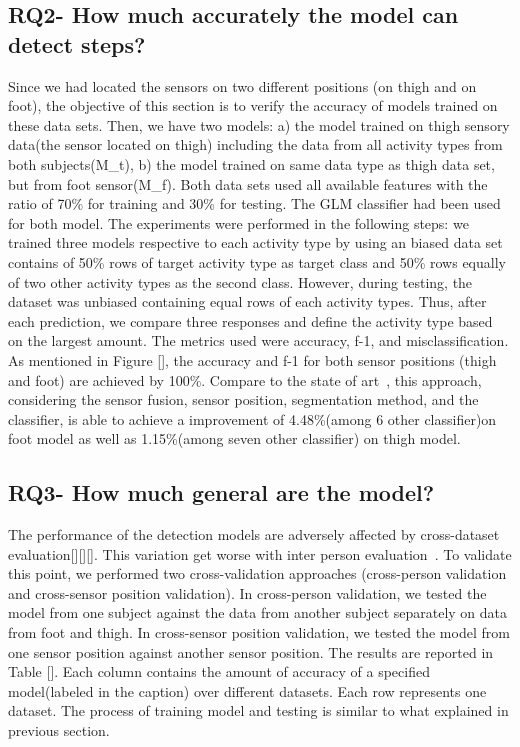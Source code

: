 \subsection{RQ2- How much accurately the model can detect steps?}
Since we had located the sensors on two different positions (on thigh and on foot), the objective of this section is to verify the accuracy of models trained on these data sets. Then, we have two models: a) the model trained on thigh sensory data(the sensor located on thigh) including the data from all activity types from both subjects(M\_{t}), b) the model trained on same data type as thigh data set, but from foot sensor(M\_{f}). Both data sets used all available features with the ratio of 70\% for training and 30\% for testing. The GLM classifier had been used for both model. The experiments were performed in the following steps: we trained three models respective to each activity type by using an biased data set contains of 50\% rows of target activity type as target class and 50\% rows equally of two other activity types as the second class. However, during testing, the dataset was unbiased containing equal rows of each activity types. Thus, after each prediction, we compare three responses and define the activity type based on the largest amount. The metrics used were accuracy, f-1, and misclassification. As mentioned in Figure [], the accuracy and f-1 for both sensor positions (thigh and foot) are achieved by 100\%. Compare to the state of art~\cite{janidarmian2017comprehensive}, this approach, considering the sensor fusion, sensor position, segmentation method, and the classifier, is able to achieve a improvement of 4.48\%(among 6 other classifier)on foot model as well as 1.15\%(among seven other classifier) on thigh model.

\subsection{RQ3- How much general are the model?}
The performance of the detection models are adversely affected by cross-dataset evaluation[][][]. This variation get worse with inter person evaluation~\cite{grzeszick2017deep}. To validate this point, we performed two cross-validation approaches (cross-person validation and cross-sensor position validation). In cross-person validation, we tested the model from one subject against the data from another subject separately on data from foot and thigh. In cross-sensor position validation, we tested the model from one sensor position against another sensor position. The results are reported in Table []. Each column contains the amount of accuracy of a specified model(labeled in the caption) over different datasets. Each row represents one dataset. The process of training model and testing is similar to what explained in previous section.

